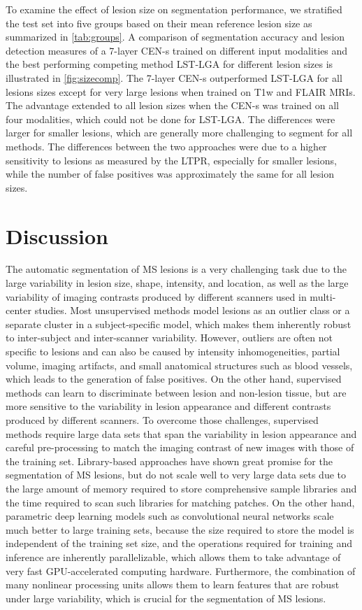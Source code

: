 To examine the effect of lesion size on segmentation performance, we stratified
the test set into five groups based on their mean reference lesion size as
summarized in \ref{tab:groups}. A comparison of segmentation accuracy and lesion
detection measures of a 7-layer CEN-s trained on different input modalities and
the best performing competing method LST-LGA for different lesion sizes is
illustrated in \ref{fig:sizecomp}. The 7-layer CEN-s outperformed LST-LGA for
all lesions sizes except for very large lesions when trained on T1w and FLAIR
MRIs. The advantage extended to all lesion sizes when the \mbox{CEN-s} was
trained on all four modalities, which could not be done for LST-LGA.
The differences were larger for smaller lesions, which are generally more
challenging to segment for all methods. The differences between the two
approaches were due to a higher sensitivity to lesions as measured by the LTPR,
especially for smaller lesions, while the number of false positives was
approximately the same for all lesion sizes.

\section{Discussion}

The automatic segmentation of MS lesions is a very challenging task due to the
large variability in lesion size, shape, intensity, and location, as well as the
large variability of imaging contrasts produced by different scanners used in
multi-center studies. Most unsupervised methods model lesions as an outlier
class or a separate cluster in a subject-specific model, which makes them
inherently robust to inter-subject and inter-scanner variability. However,
outliers are often not specific to lesions and can also be caused by intensity
inhomogeneities, partial volume, imaging artifacts, and small anatomical
structures such as blood vessels, which leads to the generation of false
positives. On the other hand, supervised methods can learn to discriminate
between lesion and non-lesion tissue, but are more sensitive to the variability
in lesion appearance and different contrasts produced by different scanners. To
overcome those challenges, supervised methods require large data sets that span
the variability in lesion appearance and careful pre-processing to match the
imaging contrast of new images with those of the training set. Library-based
approaches have shown great promise for the segmentation of MS lesions, but do
not scale well to very large data sets due to the large amount of memory
required to store comprehensive sample libraries and the time required to scan
such libraries for matching patches. On the other hand, parametric deep learning
models such as convolutional neural networks scale much better to large training
sets, because the size required to store the model is independent of the
training set size, and the operations required for training and inference are
inherently parallelizable, which allows them to take advantage of very fast
GPU-accelerated computing hardware. Furthermore, the combination of many
nonlinear processing units allows them to learn features that are robust under
large variability, which is crucial for the segmentation of MS lesions.

